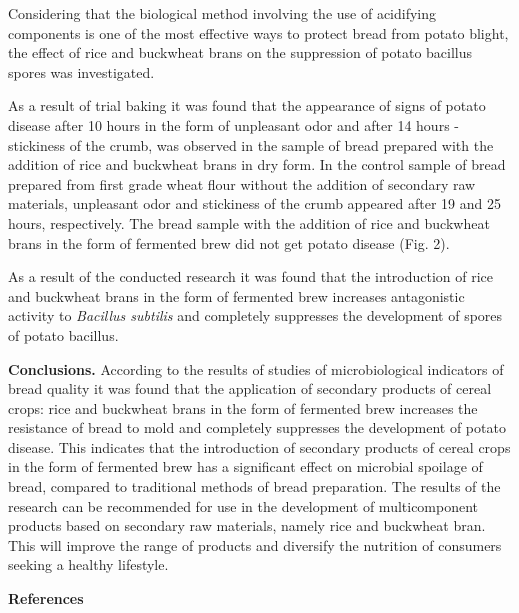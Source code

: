 \begin{multicols}{2}
Considering that the biological method involving the use of acidifying
components is one of the most effective ways to protect bread from
potato blight, the effect of rice and buckwheat brans on the suppression
of potato bacillus spores was investigated.

As a result of trial baking it was found that the appearance of signs of
potato disease after 10 hours in the form of unpleasant odor and after
14 hours - stickiness of the crumb, was observed in the sample of bread
prepared with the addition of rice and buckwheat brans in dry form. In
the control sample of bread prepared from first grade wheat flour
without the addition of secondary raw materials, unpleasant odor and
stickiness of the crumb appeared after 19 and 25 hours, respectively.
The bread sample with the addition of rice and buckwheat brans in the
form of fermented brew did not get potato disease (Fig. 2).

As a result of the conducted research it was found that the introduction
of rice and buckwheat brans in the form of fermented brew increases
antagonistic activity to \emph{Bacillus subtilis} and completely
suppresses the development of spores of potato bacillus.

{\bfseries Conclusions.} According to the results of studies of
microbiological indicators of bread quality it was found that the
application of secondary products of cereal crops: rice and buckwheat
brans in the form of fermented brew increases the resistance of bread to
mold and completely suppresses the development of potato disease. This
indicates that the introduction of secondary products of cereal crops in
the form of fermented brew has a significant effect on microbial
spoilage of bread, compared to traditional methods of bread preparation.
The results of the research can be recommended for use in the
development of multicomponent products based on secondary raw materials,
namely rice and buckwheat bran. This will improve the range of products
and diversify the nutrition of consumers seeking a healthy lifestyle.
\end{multicols}

\begin{center}
{\bfseries References}
\end{center}

